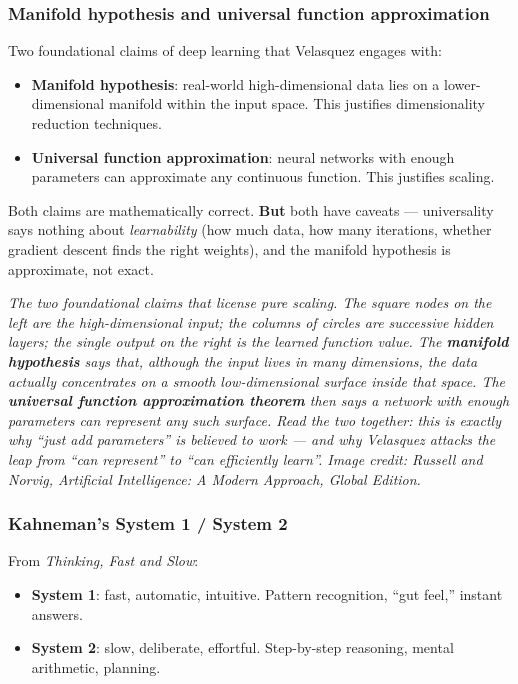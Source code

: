 \documentclass[11pt, a4paper]{article}
\begin{document}
\subsubsection*{Manifold hypothesis and universal function approximation}

Two foundational claims of deep learning that Velasquez engages with:

\begin{itemize}
  \item \textbf{Manifold hypothesis}: real-world high-dimensional data lies on a lower-dimensional manifold within the input space. This justifies dimensionality reduction techniques.
  \item \textbf{Universal function approximation}: neural networks with enough parameters can approximate any continuous function. This justifies scaling.
\end{itemize}

Both claims are mathematically correct. \textbf{But} both have caveats — universality says nothing about \emph{learnability} (how much data, how many iterations, whether gradient descent finds the right weights), and the manifold hypothesis is approximate, not exact.

\begin{center}

\footnotesize\textit{The two foundational claims that license pure scaling. The square nodes on the left are the high-dimensional input; the columns of circles are successive hidden layers; the single output on the right is the learned function value. The \textbf{manifold hypothesis} says that, although the input lives in many dimensions, the data actually concentrates on a smooth low-dimensional surface inside that space. The \textbf{universal function approximation theorem} then says a network with enough parameters can represent any such surface. Read the two together: this is exactly why ``just add parameters'' is believed to work --- and why Velasquez attacks the leap from ``can represent'' to ``can efficiently learn''. Image credit: Russell and Norvig, Artificial Intelligence: A Modern Approach, Global Edition.}
\end{center}

\subsubsection*{Kahneman's System 1 / System 2}

\begin{defbox}
From \emph{Thinking, Fast and Slow}:
\begin{itemize}[itemsep=0pt, topsep=0pt]
  \item \textbf{System 1}: fast, automatic, intuitive. Pattern recognition, ``gut feel,'' instant answers.
  \item \textbf{System 2}: slow, deliberate, effortful. Step-by-step reasoning, mental arithmetic, planning.
\end{itemize}
\end{defbox}
\end{document}
